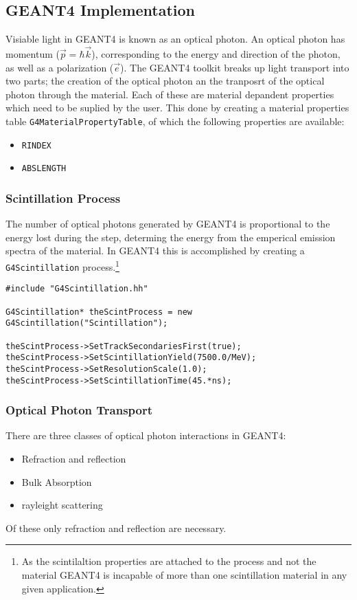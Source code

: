 

\subsection{GEANT4 Implementation}
Visiable light in GEANT4 is known as an optical photon.
An optical photon has momentum ($\vec{p} = \hbar \vec{k}$), corresponding to the energy and direction of the photon, as well as a polarization ($\vec{e}$).
The GEANT4 toolkit breaks up light transport into two parts; the creation of the optical photon an  the tranposrt of the optical photon through the material.
Each of these are material depandent properties which need to be suplied by the user.
This done by creating a material properties table \lstinline{G4MaterialPropertyTable}, of which the following properties are available:
\begin{itemize}
    \item \verb+RINDEX+
    \item \verb+ABSLENGTH+
\end{itemize}
\subsubsection{Scintillation Process}
The number of optical photons generated by GEANT4 is proportional to the energy lost during the step, determing the energy from the emperical emission spectra of the material.
In GEANT4 this is accomplished by creating a \verb+G4Scintillation+ process.\footnote{As the scintilaltion properties are attached to the process and not the material GEANT4 is incapable of more than one scintillation material in any given application.}
\begin{lstlisting}
#include "G4Scintillation.hh"

G4Scintillation* theScintProcess = new G4Scintillation("Scintillation");

theScintProcess->SetTrackSecondariesFirst(true);
theScintProcess->SetScintillationYield(7500.0/MeV);
theScintProcess->SetResolutionScale(1.0);
theScintProcess->SetScintillationTime(45.*ns);
\end{lstlisting}

\subsubsection{Optical Photon Transport}
There are three classes of optical photon interactions in GEANT4:
\begin{itemize}
    \item Refraction and reflection
    \item Bulk Absorption
    \item rayleight scattering
\end{itemize}
Of these only refraction and reflection are necessary. \cite{cern_interactionsOfOpticalPhotons}

\cite{riggi}
